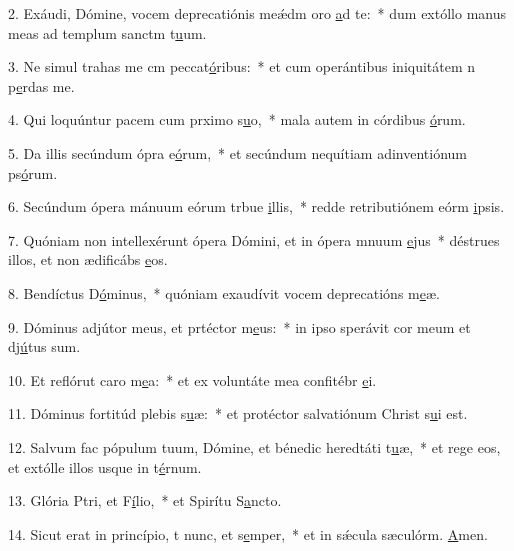 2. Exáudi, Dómine, vocem deprecatiónis meǽdm oro \uline{a}d te:~* dum extóllo manus meas ad templum sanctm t\uline{u}um.\par 
3. Ne simul trahas me cm peccat\uline{ó}ribus:~* et cum operántibus iniquitátem n p\uline{e}rdas me.\par 
4. Qui loquúntur pacem cum prximo s\uline{u}o,~* mala autem in córdibus \uline{ó}rum.\par 
5. Da illis secúndum ópra e\uline{ó}rum,~* et secúndum nequítiam adinventiónum ps\uline{ó}rum.\par 
6. Secúndum ópera mánuum eórum trbue \uline{i}llis,~* redde retributiónem eórm \uline{i}psis.\par 
7. Quóniam non intellexérunt ópera Dómini, et in ópera mnuum \uline{e}jus~* déstrues illos, et non ædificábs \uline{e}os.\par 
8. Bendíctus D\uline{ó}minus,~* quóniam exaudívit vocem deprecatións m\uline{e}æ.\par 
9. Dóminus adjútor meus, et prtéctor m\uline{e}us:~* in ipso sperávit cor meum et dj\uline{ú}tus sum.\par 
10. Et reflórut caro m\uline{e}a:~* et ex voluntáte mea confitébr \uline{e}i.\par 
11. Dóminus fortitúd plebis s\uline{u}æ:~* et protéctor salvatiónum Christ s\uline{u}i est.\par 
12. Salvum fac pópulum tuum, Dómine, et bénedic heredtáti t\uline{u}æ,~* et rege eos, et extólle illos usque in t\uline{é}rnum.\par 
13. Glória Ptri, et F\uline{í}lio,~* et Spirítu S\uline{a}ncto.\par 
14. Sicut erat in princípio, t nunc, et s\uline{e}mper,~* et in sǽcula sæculórm. \uline{A}men.\par 
